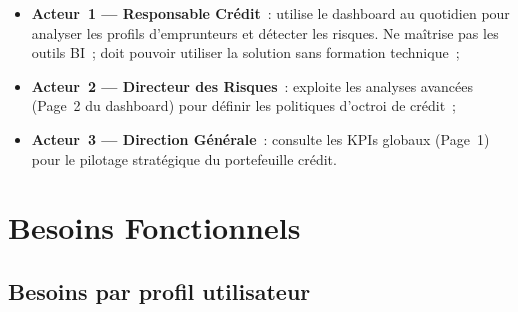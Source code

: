 \documentclass[12pt, a4paper]{report}
\begin{document}
\begin{itemize}[leftmargin=1.5em]
  \item \textbf{Acteur~1 --- Responsable Crédit}~: utilise le dashboard au quotidien
    pour analyser les profils d'emprunteurs et détecter les risques. Ne maîtrise pas
    les outils BI~; doit pouvoir utiliser la solution sans formation technique~;
  \item \textbf{Acteur~2 --- Directeur des Risques}~: exploite les analyses avancées
    (Page~2 du dashboard) pour définir les politiques d'octroi de crédit~;
  \item \textbf{Acteur~3 --- Direction Générale}~: consulte les KPIs globaux (Page~1)
    pour le pilotage stratégique du portefeuille crédit.
\end{itemize}

\section{Besoins Fonctionnels}

\subsection{Besoins par profil utilisateur}
\end{document}
